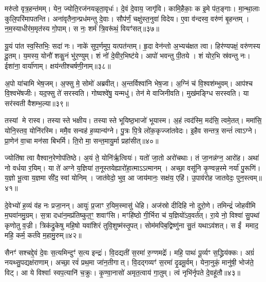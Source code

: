 मरु॑तो वृत्र॒हन्त॑मम्।
येन॒ ज्योति॒रज॑नयन्नृता॒वृधः॑।
दे॒वं दे॒वाय॒ जागृ॑वि।
कामि॒हैकाः॒ क इ॒मे प॑त॒ङ्गाः।
मा॒न्था॒लाः कुलि॒परि॑मापतन्ति।
अना॑वृतैना॒न्प्रध॑मन्तु दे॒वाः।
सौप॑र्णं॒ चक्षु॑स्त॒नुवा॑ विदेय।
ए॒वा व॑न्दस्व॒ वरु॑णं बृ॒हन्तम्।
न॒म॒स्याधीर॑म॒मृत॑स्य गो॒पाम्।
स नः॒ शर्म॑ त्रि॒वरू॑थं॒ वियꣳ॑सत्॥३७॥

यू॒यं पा॑त स्व॒स्तिभिः॒ सदा॑ नः।
नाके॑ सुप॒र्णमुप॒ यत्पत॑न्तम्।
हृ॒दा वेन॑न्तो अ॒भ्यच॑क्षत त्वा।
हिर॑ण्यपक्षं॒ वरु॑णस्य दू॒तम्।
य॒मस्य॒ योनौ॑ शकु॒नं भु॑र॒ण्युम्।
शं नो॑ दे॒वीर॒भिष्ट॑ये।
आपो॑ भवन्तु पी॒तये।
शं योर॒भि स्र॑वन्तु नः।
ईशा॑ना॒ वार्या॑णाम्।
क्षय॑न्तीश्चर्\mbox{}षणी॒नाम्॥३८॥

अ॒पो या॑चामि भेष॒जम्।
अ॒फ्सु मे॒ सोमो॑ अब्रवीत्।
अ॒न्तर्विश्वा॑नि भेष॒जा।
अ॒ग्निं च॑ वि॒श्वश॑म्भुवम्।
आप॑श्च वि॒श्वभे॑षजीः।
यद॒फ्सु ते॑ सरस्वति।
गोष्वश्वे॑षु॒ यन्मधु॑।
तेन॑ मे वाजिनीवति।
मुख॑मङ्ग्धि सरस्वति।
या सर॑स्वती वैशम्भ॒ल्या॥३९॥

तस्यां मे रास्व।
तस्यास्ते भक्षीय।
तस्यास्ते भूयिष्ठ॒भाजो॑ भूयास्म।
अ॒हं त्वद॑स्मि॒ मद॑सि॒ त्वमे॒तत्।
ममा॑सि॒ योनि॒स्तव॒ योनि॑रस्मि।
ममै॒व सन्वह॑ ह॒व्यान्य॑ग्ने।
पु॒त्रः पि॒त्रे लो॑क॒कृज्जा॑तवेदः।
इ॒हैव सन्तत्र॒ सन्तं॑ त्वा\-ऽग्ने।
प्रा॒णेन॑ वा॒चा मन॑सा बिभर्मि।
ति॒रो मा॒ सन्त॒मायु॒र्मा प्रहा॑सीत्॥४०॥

ज्योति॑षा त्वा वैश्वान॒रेणोप॑तिष्ठे।
अ॒यं ते॒ योनि॑र्\mbox{}ऋ॒त्वियः॑।
यतो॑ जा॒तो अरो॑चथाः।
तं जा॒नन्न॑ग्न॒ आरो॑ह।
अथा॑ नो वर्धया र॒यिम्।
या ते॑ अग्ने य॒ज्ञिया॑ त॒नूस्तयेह्यारो॑हा॒त्मा\-ऽऽत्मानम्।
अच्छा॒ वसू॑नि कृ॒ण्वन्न॒स्मे नर्या॑ पु॒रूणि॑।
य॒ज्ञो भू॒त्वा य॒ज्ञमा सी॑द॒ स्वां योनिम्।
जात॑वेदो॒ भुव॒ आ जाय॑मानः॒ सक्ष॑य॒ एहि॑।
उ॒पाव॑रोह जातवेदः॒ पुन॒स्त्वम्॥४१॥

दे॒वेभ्यो॑ ह॒व्यं व॑ह नः प्रजा॒नन्।
आयुः॑ प्र॒जाꣳ र॒यिम॒स्मासु॑ धेहि।
अज॑स्रो दीदिहि नो दुरो॒णे।
तमिन्द्रं॑ जोहवीमि म॒घवा॑नमु॒ग्रम्।
स॒त्रा दधा॑न॒मप्र॑तिष्कुत॒ꣳ॒ शवाꣳ॑सि।
मꣳहि॑ष्ठो गी॒र्भिरा च॑ य॒ज्ञियो॑\-ऽव॒वर्त॑त्।
रा॒ये नो॒ विश्वा॑ सु॒पथा॑ कृणोतु व॒ज्री।
त्रिक॑द्रुकेषु महि॒षो यवा॑शिरं तुवि॒शुष्म॑स्तृ॒पत्।
सोम॑मपिब॒द्विष्णु॑ना सु॒तं यथा\-ऽव॑शत्।
स ईं ममाद॒ महि॒ कर्म॒ कर्त॑वे म॒हामु॒रुम्॥४२॥

सैनꣳ॑ सश्चद्दे॒वं दे॒वः स॒त्यमिन्दुꣳ॑ स॒त्य इन्द्रः॑।
वि॒दद्यती॑ स॒रमा॑ रु॒ग्णमद्रेः᳚।
महि॒ पाथः॑ पू॒र्व्यꣳ स॒द्ध्रिय॑क्कः।
अग्रं॑ नयथ्सु॒पद्यक्ष॑राणाम्।
अच्छा॒ रवं॑ प्रथ॒मा जा॑न॒तीगात्।
वि॒दद्गव्यꣳ॑ स॒रमा॑ दृ॒ढमू॒र्वम्।
येना॒नुकं॒ मानु॑षी॒ भोज॑ते॒ विट्।
आ ये विश्वाः᳚ स्वप॒त्यानि॑ च॒क्रुः।
कृ॒ण्वा॒नासो॑ अमृत॒त्वाय॑ गा॒तुम्।
त्वं नृभि॑र्नृपते दे॒वहू॑तौ॥४३॥

